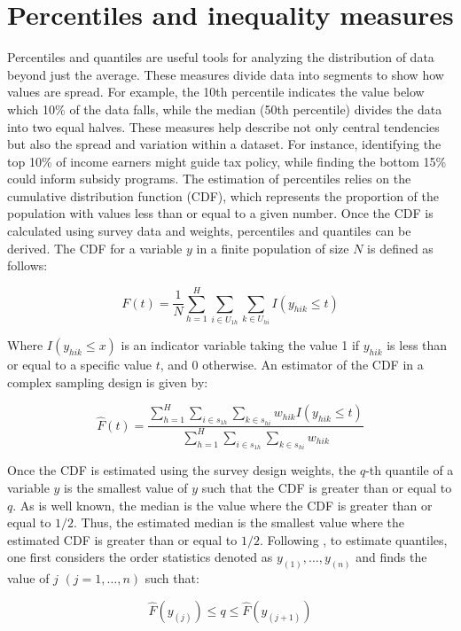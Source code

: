 \documentclass[
  12pt,
]{book}
\begin{document}
\hypertarget{percentiles-and-inequality-measures}{%
\section{Percentiles and inequality measures}\label{percentiles-and-inequality-measures}}

Percentiles and quantiles are useful tools for analyzing the distribution of data beyond just the average. These measures divide data into segments to show how values are spread. For example, the 10th percentile indicates the value below which 10\% of the data falls, while the median (50th percentile) divides the data into two equal halves. These measures help describe not only central tendencies but also the spread and variation within a dataset. For instance, identifying the top 10\% of income earners might guide tax policy, while finding the bottom 15\% could inform subsidy programs. The estimation of percentiles relies on the cumulative distribution function (CDF), which represents the proportion of the population with values less than or equal to a given number. Once the CDF is calculated using survey data and weights, percentiles and quantiles can be derived. The CDF for a variable \(y\) in a finite population of size \(N\) is defined as follows:

\[
F(t) = \frac{1}{N}\sum_{h=1}^{H}\sum_{i \in U_{1h}} \sum_{ k \in U_{hi}}  I(y_{hik} \leq t) 
\]

Where \(I(y_{hik} \leq x)\) is an indicator variable taking the value 1 if \(y_{hik}\) is less than or equal to a specific value \(t\), and 0 otherwise. An estimator of the CDF in a complex sampling design is given by:

\[
\widehat{F}(t) = \frac{\sum_{h=1}^{H}\sum_{i \in s_{1h}} \sum_{ k \in s_{hi}} w_{hik} I(y_{hik}\leq t)}{\sum_{h=1}^{H}\sum_{i \in s_{1h}} \sum_{ k \in s_{hi}} w_{hik}}
\]

Once the CDF is estimated using the survey design weights, the \(q\)-th quantile of a variable \(y\) is the smallest value of \(y\) such that the CDF is greater than or equal to \(q\). As is well known, the median is the value where the CDF is greater than or equal to \(1/2\). Thus, the estimated median is the smallest value where the estimated CDF is greater than or equal to \(1/2\). Following \citet{Heeringa2017}, to estimate quantiles, one first considers the order statistics denoted as \(y_{(1)}, \ldots, y_{(n)}\) and finds the value of \(j\) \((j=1, \ldots, n)\) such that:

\[
\widehat{F}(y_{(j)}) \leq q\leq\widehat{F}(y_{(j+1)})
\]
\end{document}
